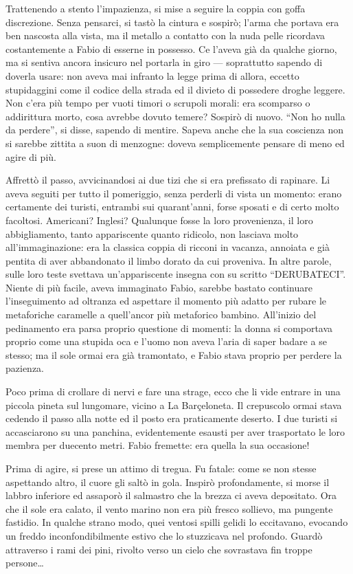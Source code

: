 Trattenendo a stento l'impazienza, si mise a seguire la coppia con goffa discrezione. Senza pensarci, si tastò la cintura e sospirò; l'arma che portava era ben nascosta alla vista, ma il metallo a contatto con la nuda pelle ricordava costantemente a Fabio di esserne in possesso. Ce l'aveva già da qualche giorno, ma si sentiva ancora insicuro nel portarla in giro --- soprattutto sapendo di doverla usare: non aveva mai infranto la legge prima di allora, eccetto stupidaggini come il codice della strada ed il divieto di possedere droghe leggere. Non c'era più tempo per vuoti timori o scrupoli morali: era scomparso o addirittura morto, cosa avrebbe dovuto temere? Sospirò di nuovo. ``Non ho nulla da perdere'', si disse, sapendo di mentire. Sapeva anche che la sua coscienza non si sarebbe zittita a suon di menzogne: doveva semplicemente pensare di meno ed agire di più.

Affrettò il passo, avvicinandosi ai due tizi che si era prefissato di rapinare. Li aveva seguiti per tutto il pomeriggio, senza perderli di vista un momento: erano certamente dei turisti, entrambi sui quarant'anni, forse sposati e di certo molto facoltosi. Americani? Inglesi? Qualunque fosse la loro provenienza, il loro abbigliamento, tanto appariscente quanto ridicolo, non lasciava molto all'immaginazione: era la classica coppia di ricconi in vacanza, annoiata e già pentita di aver abbandonato il limbo dorato da cui proveniva. In altre parole, sulle loro teste svettava un'appariscente insegna con su scritto ``DERUBATECI''. Niente di più facile, aveva immaginato Fabio, sarebbe bastato continuare l'inseguimento ad oltranza ed aspettare il momento più adatto per rubare le metaforiche caramelle a quell'ancor più metaforico bambino. All'inizio del pedinamento era parsa proprio questione di momenti: la donna si comportava proprio come una stupida oca e l'uomo non aveva l'aria di saper badare a se stesso; ma il sole ormai era già tramontato, e Fabio stava proprio per perdere la pazienza.

Poco prima di crollare di nervi e fare una strage, ecco che li vide entrare in una piccola pineta sul lungomare, vicino a La Barçeloneta. Il crepuscolo ormai stava cedendo il passo alla notte ed il posto era praticamente deserto. I due turisti si accasciarono su una panchina, evidentemente esausti per aver trasportato le loro membra per duecento metri. Fabio fremette: era quella la sua occasione!

Prima di agire, si prese un attimo di tregua. Fu fatale: come se non stesse aspettando altro, il cuore gli saltò in gola. Inspirò profondamente, si morse il labbro inferiore ed assaporò il salmastro che la brezza ci aveva depositato. Ora che il sole era calato, il vento marino non era più fresco sollievo, ma pungente fastidio. In qualche strano modo, quei ventosi spilli gelidi lo eccitavano, evocando un freddo inconfondibilmente estivo che lo stuzzicava nel profondo. Guardò attraverso i rami dei pini, rivolto verso un cielo che sovrastava fin troppe persone\ldots

